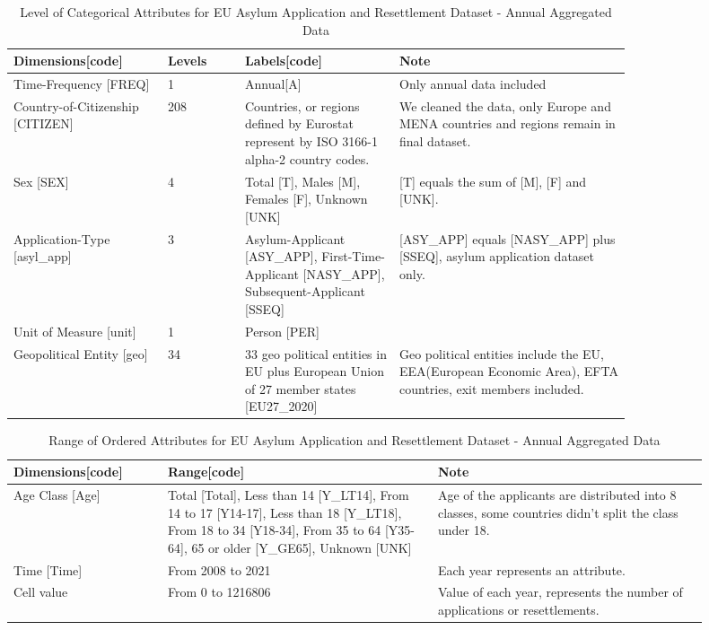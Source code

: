 \documentclass[journal]{vgtc}                %
\begin{document}
\begin{table}[tb]
  \caption{Level of Categorical Attributes for EU Asylum Application and Resettlement Dataset - Annual Aggregated Data}
  \label{tab:lev1}
  \scriptsize
	\centering
  \begin{tabular}{p{0.2\linewidth}p{0.1\linewidth}p{0.2\linewidth}p{0.3\linewidth}}
    \toprule
    Dimensions[code] & Levels & Labels[code] & Note \\
    \midrule
    Time-Frequency [FREQ] & 1 & Annual[A] & Only annual data included \\
    Country-of-Citizenship [CITIZEN] & 208 & Countries, or regions defined by Eurostat represent by ISO 3166-1 alpha-2 country codes. & We cleaned the data, only Europe and MENA countries and regions remain in final dataset. \\
    Sex [SEX] & 4 & Total [T], Males [M], Females [F], Unknown [UNK] & [T] equals the sum of [M], [F] and [UNK]. \\
    Application-Type [asyl\_app] & 3 & Asylum-Applicant [ASY\_APP], First-Time-Applicant [NASY\_APP], Subsequent-Applicant [SSEQ] & [ASY\_APP] equals [NASY\_APP] plus [SSEQ], asylum application dataset only. \\
    Unit of Measure [unit] & 1 & Person [PER] & \\
    Geopolitical Entity [geo] & 34 & 33 geo political entities in EU plus European Union of 27 member states [EU27\_2020] & Geo political entities include the EU, EEA(European Economic Area), EFTA countries, exit members included.
  \end{tabular}
\end{table}

\begin{table}[tb]
  \caption{Range of Ordered Attributes for EU Asylum Application and Resettlement Dataset - Annual Aggregated Data}
  \label{tab:lev2}
  \scriptsize
	\centering
  \begin{tabular}{p{0.2\linewidth}p{0.35\linewidth}p{0.35\linewidth}}
    \toprule
    Dimensions[code] & Range[code] & Note \\
    \midrule
    Age Class [Age] & Total [Total], Less than 14 [Y\_LT14], From 14 to 17 [Y14-17], Less than 18 [Y\_LT18], From 18 to 34 [Y18-34], From 35 to 64 [Y35-64], 65 or older [Y\_GE65], Unknown [UNK] & Age of the applicants are distributed into 8 classes, some countries didn't split the class under 18. \\
    Time [Time] & From 2008 to 2021 & Each year represents an attribute. \\
    Cell value & From 0 to 1216806 & Value of each year, represents the number of applications or resettlements. \\
  \end{tabular}
\end{table}
\end{document}
